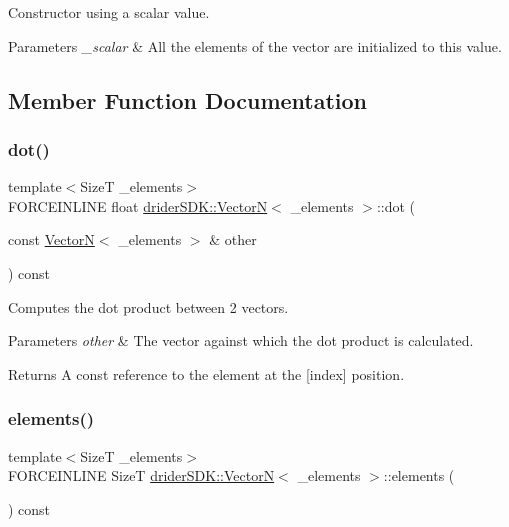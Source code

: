 Constructor using a scalar value.


\begin{DoxyParams}{Parameters}
{\em \+\_\+scalar} & All the elements of the vector are initialized to this value. \\
\hline
\end{DoxyParams}


\subsection{Member Function Documentation}
\mbox{\label{classdrider_s_d_k_1_1_vector_n_ad48030d3daf764a398547631a348055a}} 
\subsubsection{\texorpdfstring{dot()}{dot()}}
{\footnotesize\ttfamily template$<$SizeT \+\_\+elements$>$ \\
F\+O\+R\+C\+E\+I\+N\+L\+I\+NE float \hyperlink{classdrider_s_d_k_1_1_vector_n}{drider\+S\+D\+K\+::\+VectorN}$<$ \+\_\+elements $>$\+::dot (\begin{DoxyParamCaption}\item[{const \hyperlink{classdrider_s_d_k_1_1_vector_n}{VectorN}$<$ \+\_\+elements $>$ \&}]{other }\end{DoxyParamCaption}) const\hspace{0.3cm}{\ttfamily [inline]}}

Computes the dot product between 2 vectors.


\begin{DoxyParams}{Parameters}
{\em other} & The vector against which the dot product is calculated.\\
\hline
\end{DoxyParams}
\begin{DoxyReturn}{Returns}
A const reference to the element at the \mbox{[}index\mbox{]} position. 
\end{DoxyReturn}
\mbox{\label{classdrider_s_d_k_1_1_vector_n_a2aa5dfff2cdcc4ae187905b2fbddfa57}} 
\subsubsection{\texorpdfstring{elements()}{elements()}}
{\footnotesize\ttfamily template$<$SizeT \+\_\+elements$>$ \\
F\+O\+R\+C\+E\+I\+N\+L\+I\+NE SizeT \hyperlink{classdrider_s_d_k_1_1_vector_n}{drider\+S\+D\+K\+::\+VectorN}$<$ \+\_\+elements $>$\+::elements (\begin{DoxyParamCaption}{ }\end{DoxyParamCaption}) const\hspace{0.3cm}{\ttfamily [inline]}}

